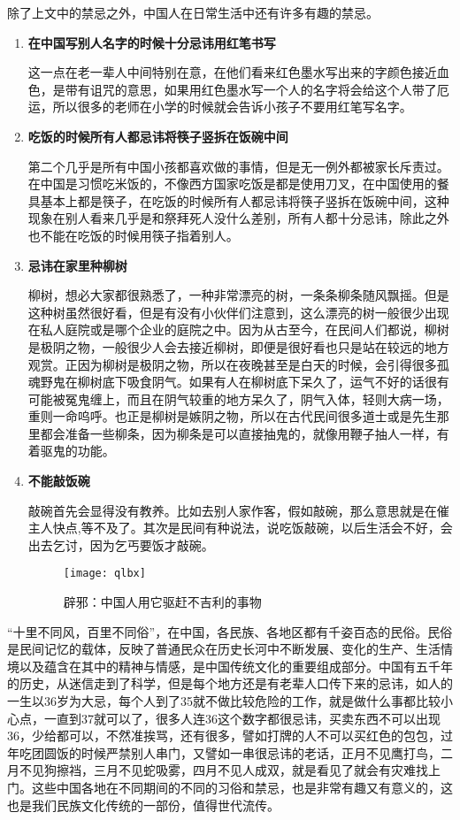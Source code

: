    除了上文中的禁忌之外，中国人在日常生活中还有许多有趣的禁忌。
    \begin{enumerate}
    \item
    \textbf{在中国写别人名字的时候十分忌讳用红笔书写}

   这一点在老一辈人中间特别在意，在他们看来红色墨水写出来的字颜色接近血色，是带有诅咒的意思，如果用红色墨水写一个人的名字将会给这个人带了厄运，所以很多的老师在小学的时候就会告诉小孩子不要用红笔写名字。

   \item
   \textbf{吃饭的时候所有人都忌讳将筷子竖拆在饭碗中间}

   第二个几乎是所有中国小孩都喜欢做的事情，但是无一例外都被家长斥责过。在中国是习惯吃米饭的，不像西方国家吃饭是都是使用刀叉，在中国使用的餐具基本上都是筷子，在吃饭的时候所有人都忌讳将筷子竖拆在饭碗中间，这种现象在别人看来几乎是和祭拜死人没什么差别，所有人都十分忌讳，除此之外也不能在吃饭的时候用筷子指着别人。

   \item
   \textbf{忌讳在家里种柳树}

   柳树，想必大家都很熟悉了，一种非常漂亮的树，一条条柳条随风飘摇。但是这种树虽然很好看，但是有没有小伙伴们注意到，这么漂亮的树一般很少出现在私人庭院或是哪个企业的庭院之中。因为从古至今，在民间人们都说，柳树是极阴之物，一般很少人会去接近柳树，即便是很好看也只是站在较远的地方观赏。正因为柳树是极阴之物，所以在夜晚甚至是白天的时候，会引得很多孤魂野鬼在柳树底下吸食阴气。如果有人在柳树底下呆久了，运气不好的话很有可能被冤鬼缠上，而且在阴气较重的地方呆久了，阴气入体，轻则大病一场，重则一命呜呼。也正是柳树是嫉阴之物，所以在古代民间很多道士或是先生那里都会准备一些柳条，因为柳条是可以直接抽鬼的，就像用鞭子抽人一样，有着驱鬼的功能。

   \item
   \textbf{不能敲饭碗}

   敲碗首先会显得没有教养。比如去别人家作客，假如敲碗，那么意思就是在催主人快点,等不及了。其次是民间有种说法，说吃饭敲碗，以后生活会不好，会出去乞讨，因为乞丐要饭才敲碗。
        
   \begin{figure}[htb]
    \centering
    \texttt{[image: qlbx]}
    \caption{辟邪：中国人用它驱赶不吉利的事物}
    
    \end{figure}

    \end{enumerate}



   “十里不同风，百里不同俗”，在中国，各民族、各地区都有千姿百态的民俗。民俗是民间记忆的载体，反映了普通民众在历史长河中不断发展、变化的生产、生活情境以及蕴含在其中的精神与情感，是中国传统文化的重要组成部分。中国有五千年的历史，从迷信走到了科学，但是每个地方还是有老辈人口传下来的忌讳，如人的一生以36岁为大忌，每个人到了35就不做比较危险的工作，就是做什么事都比较小心点，一直到37就可以了，很多人连36这个数字都很忌讳，买卖东西不可以出现36，少给都可以，不然准挨骂，还有很多，譬如打牌的人不可以买红色的包包，过年吃团圆饭的时候严禁别人串门，又譬如一串很忌讳的老话，正月不见鹰打鸟，二月不见狗擦裆，三月不见蛇吸雾，四月不见人成双，就是看见了就会有灾难找上门。这些中国各地在不同期间的不同的习俗和禁忌，也是非常有趣又有意义的，这也是我们民族文化传统的一部份，值得世代流传。
